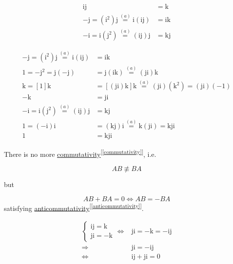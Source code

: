 \documentclass[
]{book}
\theoremstyle{definition}
\theoremstyle{definition}
\theoremstyle{definition}
\theoremstyle{definition}
\theoremstyle{remark}
\begin{document}
\[
\begin{aligned}
\mathrm{i}\mathrm{j} & =\mathrm{k}\\
-\mathrm{j}=\left(\mathrm{i}^{2}\right)\mathrm{j}\overset{\left(a\right)}{=}\mathrm{i}\left(\mathrm{i}\mathrm{j}\right) & =\mathrm{i}\mathrm{k}\\
-\mathrm{i}=\mathrm{i}\left(\mathrm{j}^{2}\right)\overset{\left(a\right)}{=}\left(\mathrm{i}\mathrm{j}\right)\mathrm{j} & =\mathrm{k}\mathrm{j}
\end{aligned}
\]

\[
\begin{aligned}
-\mathrm{j}=\left(\mathrm{i}^{2}\right)\mathrm{j}\overset{\left(a\right)}{=}\mathrm{i}\left(\mathrm{i}\mathrm{j}\right) & =\mathrm{i}\mathrm{k}\\
1=-\mathrm{j}^{2}=\mathrm{j}\left(-\mathrm{j}\right) & =\mathrm{j}\left(\mathrm{i}\mathrm{k}\right)\overset{\left(a\right)}{=}\left(\mathrm{j}\mathrm{i}\right)\mathrm{k}\\
\mathrm{k}=\left[1\right]\mathrm{k} & =\left[\left(\mathrm{j}\mathrm{i}\right)\mathrm{k}\right]\mathrm{k}\overset{\left(a\right)}{=}\left(\mathrm{j}\mathrm{i}\right)\left(\mathrm{k}^{2}\right)=\left(\mathrm{j}\mathrm{i}\right)\left(-1\right)\\
-\mathrm{k} & =\mathrm{j}\mathrm{i}\\
-\mathrm{i}=\mathrm{i}\left(\mathrm{j}^{2}\right)\overset{\left(a\right)}{=}\left(\mathrm{i}\mathrm{j}\right)\mathrm{j} & =\mathrm{k}\mathrm{j}\\
1=\left(-\mathrm{i}\right)\mathrm{i} & =\left(\mathrm{k}\mathrm{j}\right)\mathrm{i}\overset{\left(a\right)}{=}\mathrm{k}\left(\mathrm{j}\mathrm{i}\right)=\mathrm{k}\mathrm{j}\mathrm{i}\\
1 & =\mathrm{k}\mathrm{j}\mathrm{i}
\end{aligned}
\]

There is no more \protect\hyperlink{commutativity}{commutativity}\textsuperscript{{[}\ref{commutativity}{]}}, i.e.

\[
AB\not\equiv BA
\]

but

\[
AB+BA=0\Leftrightarrow AB=-BA
\]
satisfying \protect\hyperlink{anticommutativity}{anticommutativity}\textsuperscript{{[}\ref{anticommutativity}{]}}.

\[
\begin{aligned}
\begin{cases}
\mathrm{i}\mathrm{j}=\mathrm{k}\\
\mathrm{j}\mathrm{i}=-\mathrm{k}
\end{cases}\Leftrightarrow & \mathrm{j}\mathrm{i}=-\mathrm{k}=-\mathrm{i}\mathrm{j}\\
\Rightarrow & \mathrm{j}\mathrm{i}=-\mathrm{i}\mathrm{j}\\
\Leftrightarrow & \mathrm{i}\mathrm{j}+\mathrm{j}\mathrm{i}=0
\end{aligned}
\]
\end{document}
